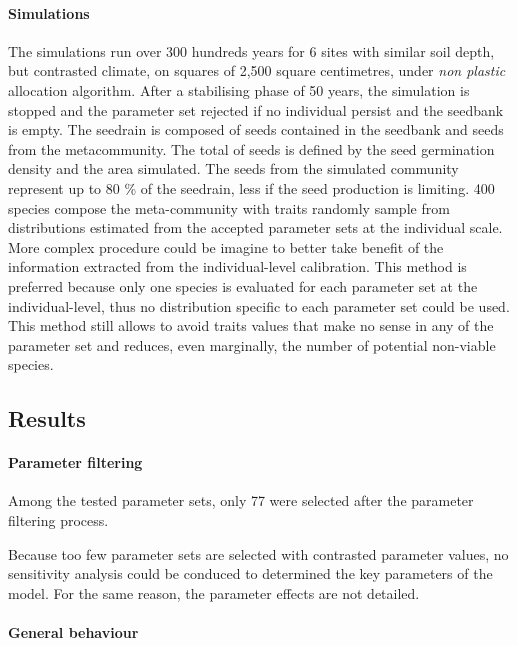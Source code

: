 \paragraph{Simulations}
The simulations run over 300 hundreds years for 6 sites with similar soil depth, but contrasted climate, on squares of 2,500 square centimetres, under \textit{non plastic} allocation algorithm. After a stabilising phase of 50 years, the simulation is stopped and the parameter set rejected if no individual persist and the seedbank is empty. The seedrain is composed of seeds contained in the seedbank and seeds from the metacommunity. The total of seeds is defined by the seed germination density and the area simulated. The seeds from the simulated community represent up to 80 \% of the seedrain, less if the seed production is limiting. 400 species compose the meta-community with traits randomly sample from distributions estimated from the accepted parameter sets at the individual scale. More complex procedure could be imagine to better take benefit of the information extracted from the individual-level calibration. This method is preferred because only one species is evaluated for each parameter set at the individual-level, thus no distribution specific to each parameter set could be used. This method still allows to avoid traits values that make no sense in any of the parameter set and reduces, even marginally, the number of potential non-viable species.



\subsection{Results}


\paragraph{Parameter filtering}

Among the  tested parameter sets, only 77 were selected after the parameter filtering process. 

Because too few parameter sets are selected with contrasted parameter values, no sensitivity analysis could be conduced to determined the key parameters of the model. For the same reason, the parameter effects are not detailed.

\paragraph{General behaviour}


